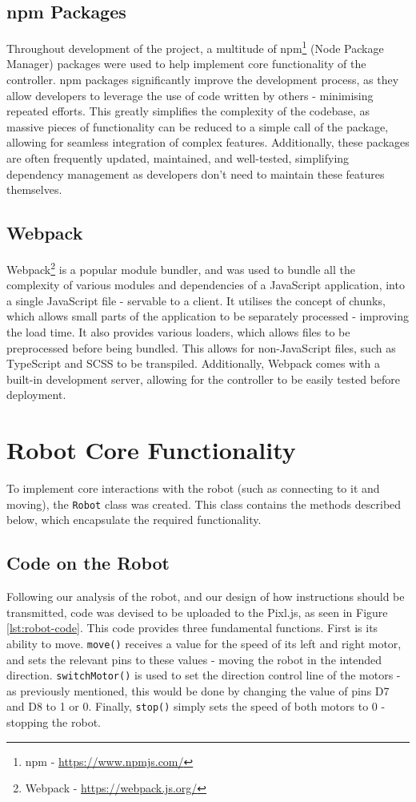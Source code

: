 \documentclass{l4proj}
\begin{document}
\subsection{npm Packages}
Throughout development of the project, a multitude of npm\footnote{npm - \url{https://www.npmjs.com/}} (Node Package Manager) packages were used to help implement core functionality of the controller. npm packages significantly improve the development process, as they allow developers to leverage the use of code written by others - minimising repeated efforts. This greatly simplifies the complexity of the codebase, as massive pieces of functionality can be reduced to a simple call of the package, allowing for seamless integration of complex features. Additionally, these packages are often frequently updated, maintained, and well-tested, simplifying dependency management as developers don’t need to maintain these features themselves.

\subsection{Webpack}
Webpack\footnote{Webpack - \url{https://webpack.js.org/}} is a popular module bundler, and was used to bundle all the complexity of various modules and dependencies of a JavaScript application, into a single JavaScript file - servable to a client. It utilises the concept of chunks, which allows small parts of the application to be separately processed - improving the load time. It also provides various loaders, which allows files to be preprocessed before being bundled. This allows for non-JavaScript files, such as TypeScript and SCSS to be transpiled. Additionally, Webpack comes with a built-in development server, allowing for the controller to be easily tested before deployment.


\section{Robot Core Functionality}
To implement core interactions with the robot (such as connecting to it and moving), the \lstinline{Robot} class was created. This class contains the methods described below, which encapsulate the required functionality.

\subsection{Code on the Robot}
Following our analysis of the robot, and our design of how instructions should be transmitted, code was devised to be uploaded to the Pixl.js, as seen in Figure \ref{lst:robot-code}. This code provides three fundamental functions. First is its ability to move. \lstinline{move()} receives a value for the speed of its left and right motor, and sets the relevant pins to these values - moving the robot in the intended direction. \lstinline{switchMotor()} is used to set the direction control line of the motors - as previously mentioned, this would be done by changing the value of pins D7 and D8 to 1 or 0. Finally, \lstinline{stop()} simply sets the speed of both motors to 0 - stopping the robot.
\end{document}
